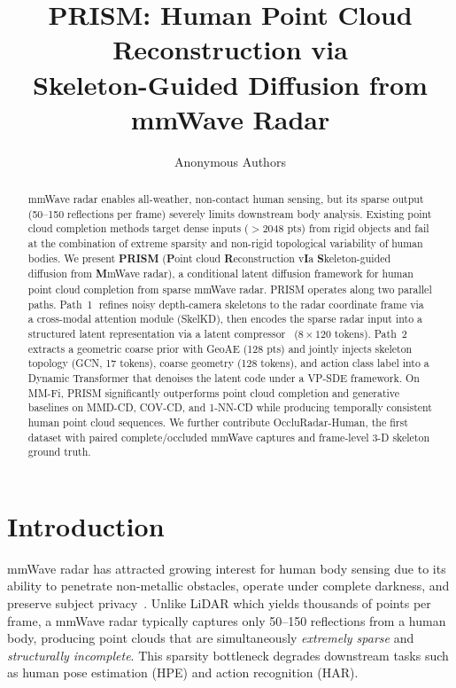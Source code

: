 \documentclass{article}
\title{PRISM: Human Point Cloud Reconstruction via \\
       Skeleton-Guided Diffusion from mmWave Radar}
\author{Anonymous Authors}
\begin{document}
\maketitle

\begin{abstract}
mmWave radar enables all-weather, non-contact human sensing, but its sparse output
(50--150 reflections per frame) severely limits downstream body analysis.
Existing point cloud completion methods target dense inputs ($>$2048 pts) from
rigid objects and fail at the combination of extreme sparsity and non-rigid
topological variability of human bodies.
We present \textbf{PRISM} (\textbf{P}oint cloud \textbf{R}econstruction v\textbf{I}a
\textbf{S}keleton-guided diffusion from \textbf{M}mWave radar), a conditional
latent diffusion framework for human point cloud completion from sparse mmWave radar.
PRISM operates along two parallel paths.
Path~\textcircled{1} refines noisy depth-camera skeletons to the radar coordinate
frame via a cross-modal attention module (SkelKD), then encodes the sparse radar
input into a structured latent representation via a latent compressor~\cite{ldt}
($8\!\times\!120$ tokens).
Path~\textcircled{2} extracts a geometric coarse prior with GeoAE (128 pts)
and jointly injects skeleton topology (GCN, 17 tokens), coarse geometry (128 tokens),
and action class label into a Dynamic Transformer that denoises the latent code under
a VP-SDE framework.
On MM-Fi, PRISM significantly outperforms point cloud completion and generative
baselines on MMD-CD, COV-CD, and 1-NN-CD while producing temporally consistent
human point cloud sequences.
We further contribute OccluRadar-Human, the first dataset with paired
complete/occluded mmWave captures and frame-level 3-D skeleton ground truth.
\end{abstract}

\section{Introduction}
\label{sec:intro}

mmWave radar has attracted growing interest for human body sensing due to its
ability to penetrate non-metallic obstacles, operate under complete darkness, and
preserve subject privacy~\cite{yang2023mmfi}.
Unlike LiDAR which yields thousands of points per frame, a mmWave radar typically
captures only 50--150 reflections from a human body, producing point clouds that
are simultaneously \emph{extremely sparse} and \emph{structurally incomplete}.
This sparsity bottleneck degrades downstream tasks such as human pose
estimation (HPE) and action recognition (HAR).
\end{document}

